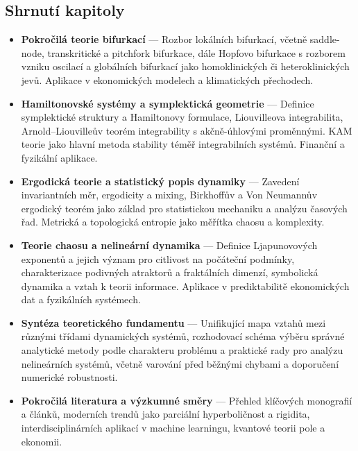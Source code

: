 \subsection{Shrnutí kapitoly}

\begin{itemize}
    \item \textbf{Pokročilá teorie bifurkací} — Rozbor lokálních bifurkací, včetně saddle-node, transkritické a pitchfork bifurkace, dále Hopfovo bifurkace s rozborem vzniku oscilací a globálních bifurkací jako homoklinických či heteroklinických jevů. Aplikace v ekonomických modelech a klimatických přechodech.
    
    \item \textbf{Hamiltonovské systémy a symplektická geometrie} — Definice symplektické struktury a Hamiltonovy formulace, Liouvilleova integrabilita, Arnold–Liouvilleův teorém integrability s akčně-úhlovými proměnnými. KAM teorie jako hlavní metoda stability téměř integrabilních systémů. Finanční a fyzikální aplikace.
    
    \item \textbf{Ergodická teorie a statistický popis dynamiky} — Zavedení invariantních měr, ergodicity a mixing, Birkhoffův a Von Neumannův ergodický teorém jako základ pro statistickou mechaniku a analýzu časových řad. Metrická a topologická entropie jako měřítka chaosu a komplexity.
    
    \item \textbf{Teorie chaosu a nelineární dynamika} — Definice Ljapunovových exponentů a jejich význam pro citlivost na počáteční podmínky, charakterizace podivných atraktorů a fraktálních dimenzí, symbolická dynamika a vztah k teorii informace. Aplikace v prediktabilitě ekonomických dat a fyzikálních systémech.
    
    \item \textbf{Syntéza teoretického fundamentu} — Unifikující mapa vztahů mezi různými třídami dynamických systémů, rozhodovací schéma výběru správné analytické metody podle charakteru problému a praktické rady pro analýzu nelineárních systémů, včetně varování před běžnými chybami a doporučení numerické robustnosti.
    
    \item \textbf{Pokročilá literatura a výzkumné směry} — Přehled klíčových monografií a článků, moderních trendů jako parciální hyperboličnost a rigidita, interdisciplinárních aplikací v machine learningu, kvantové teorii pole a ekonomii.
  \end{itemize}
    